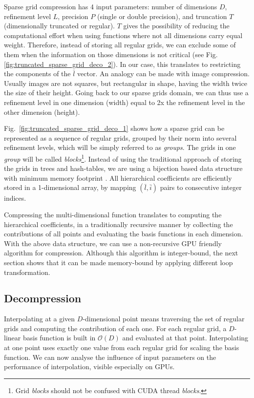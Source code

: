 Sparse grid compression has 4 input parameters: number of dimensions $D$,
refinement level $L$, precision $P$ (single or double precision), and truncation
$T$ (dimensionally truncated or regular). $T$ gives the possibility of reducing
the computational effort when using functions where not all dimensions carry
equal weight. Therefore, instead of storing all regular grids, we can exclude
some of them when the information on those dimensions is not critical (see Fig.
\ref{fig:truncated_sparse_grid_deco_2}). In our case, this translates to
restricting the components of the $\bar{l}$ vector. An analogy can be made with
image compression. Usually images are not squares, but rectangular in shape,
having the width twice the size of their height. Going back to our sparse grids
domain, we can thus use a refinement level in one dimension (width) equal to 2x
the refinement level in the other dimension (height).

Fig.~\ref{fig:truncated_sparse_grid_deco_1} shows how a sparse grid can be
represented as a sequence of regular grids, grouped by their norm into several
refinement levels, which will be simply referred to as \textit{groups}. The
grids in one \textit{group} will be called \textit{blocks}\footnote{Grid
\textit{blocks} should not be confused with CUDA thread \textit{blocks}.}.
Instead of using the traditional approach of storing the grids in trees and
hash-tables, we are using a bijection based data structure with minimum memory
footprint \cite{Murarasu:2011:CDS:1941553.1941559}. All hierarchical
coefficients are efficiently stored in a 1-dimensional array, by mapping
$(\bar{l},\bar{i})$ pairs to consecutive integer indices.

Compressing the multi-dimensional function translates to computing the
hierarchical coefficients, in a traditionally recursive manner by collecting the
contributions of all points and evaluating the basis functions in each
dimension. With the above data structure, we can use a non-recursive
GPU friendly algorithm for compression. Although this algorithm is
integer-bound, the next section shows that it can be made memory-bound by
applying different loop transformation.

\subsection{Decompression}

Interpolating at a given $D$-dimensional point means traversing the set of
regular grids and computing the contribution of each one. For each regular grid,
a $D$-linear basis function is built in $\mathcal{O}(D)$ and evaluated at that
point. Interpolating at one point uses exactly one value from each regular grid
for scaling the basis function. We can now analyse the influence of input
parameters on the performance of interpolation, visible especially on GPUs.

